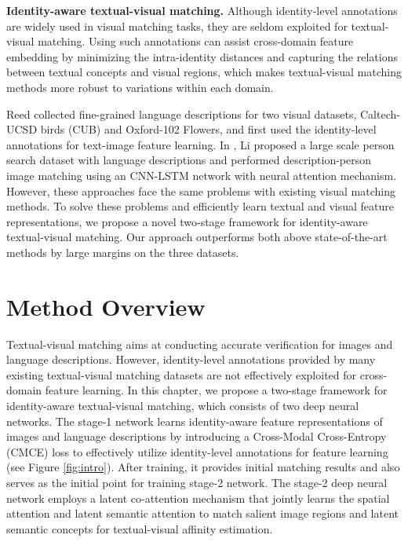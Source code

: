 \textbf{Identity-aware textual-visual matching.} Although identity-level annotations are widely used in visual matching tasks, they are seldom exploited for textual-visual matching. Using such annotations can assist cross-domain feature embedding by minimizing the intra-identity distances and capturing the relations between textual concepts and visual regions, which makes textual-visual matching methods more robust to variations within each domain.

Reed \etal \cite{reed2016learning} collected fine-grained language descriptions for two visual datasets, Caltech-UCSD birds (CUB) and Oxford-102 Flowers, and first used the identity-level annotations for text-image feature learning. In \cite{li2017person}, Li \etal proposed a large scale person search dataset with language descriptions and performed description-person image matching using an CNN-LSTM network with neural attention mechanism.
However, these approaches face the same problems with existing visual matching methods.
To solve these problems and efficiently learn textual and visual feature representations, we propose a novel two-stage framework for identity-aware textual-visual matching. Our approach outperforms both above state-of-the-art methods by large margins on the three datasets.

\section{Method Overview} %
Textual-visual matching aims at conducting accurate verification for images and language descriptions. However, identity-level annotations provided by many existing textual-visual matching datasets are not effectively exploited for cross-domain feature learning.
In this chapter, we propose a two-stage framework for identity-aware textual-visual matching, which consists of two deep neural networks. The stage-1 network learns identity-aware feature representations of images and language descriptions by introducing a Cross-Modal Cross-Entropy (CMCE) loss to effectively utilize identity-level annotations for feature learning (see Figure \ref{fig:intro}). After training, it provides initial matching results and also serves as the initial point for training stage-2 network.
The stage-2 deep neural network employs a latent co-attention mechanism that jointly learns the spatial attention and latent semantic attention to match salient image regions and latent semantic concepts for textual-visual affinity estimation.

